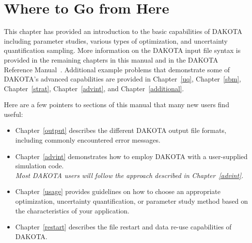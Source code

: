 \section{Where to Go from Here}\label{tutorial:where}

This chapter has provided an introduction to the basic capabilities of
DAKOTA including parameter studies, various types of optimization, and
uncertainty quantification sampling. More information on the DAKOTA
input file syntax is provided in the remaining chapters in this manual
and in the DAKOTA Reference Manual~\cite{RefMan}. Additional example
problems that demonstrate some of DAKOTA's advanced capabilities are
provided in Chapter~\ref{uq}, Chapter~\ref{sbm}, Chapter~\ref{strat},
Chapter~\ref{advint}, and Chapter~\ref{additional}.

Here are a few pointers to sections of this manual that many new users
find useful:

\begin{itemize}
\item Chapter~\ref{output} describes the different DAKOTA output file
  formats, including commonly encountered error messages.
\item Chapter~\ref{advint} demonstrates how to employ DAKOTA with a
  user-supplied simulation code.\\
  \emph{Most DAKOTA users will follow the approach described in Chapter~\ref{advint}.}
\item Chapter~\ref{usage} provides guidelines on how to choose an
  appropriate optimization, uncertainty quantification, or parameter
  study method based on the characteristics of your application.
\item Chapter~\ref{restart} describes the file restart and data re-use
  capabilities of DAKOTA.
\end{itemize}
